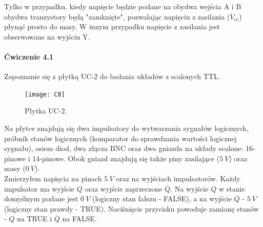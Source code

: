 \documentclass[14pt, table]{extarticle}
\newcommand{\nl}{\vspace{0.5cm}}
\begin{document}
\nl 
Tylko w przypadku, kiedy napięcie będzie podane na obydwa wejścia A i B obydwa tranzystory będą "zamknięte", pozwalając napięciu z zasilania ($V_{cc}$) płynąć prosto do masy. W innym przypadku napięcie z zasilania jest obserwowane na wyjściu Y.

\newpage
\paragraph{Ćwiczenie 4.1 \\}
Zapoznanie się z płytką UC-2 do badania układów z scalonych TTL.

\begin{figure}[H]
\texttt{[image: C0]}
\centering
\captionsetup{labelformat=empty}
\caption{Płytka UC-2.}
\end{figure}

Na płytce znajdują się dwa impulsatory do wytwarzania sygnałów logicznych, próbnik stanów logicznych (komparator do sprawdzania wartości logicznej sygnału), osiem diod, dwa złącza BNC oraz dwa gniazda na układy scalone: 16-pinowe i 14-pinowe. Obok gniazd znajdują się także piny zasilające ($5 \ V$) oraz masy ($0 \ V$). \\

\newpage
Zmierzyłem napięcia na pinach $5 \ V$ oraz na wyjściach impulsatorów. Każdy impulsator ma wyjście $Q$ oraz wyjście zaprzeczone $\overline{Q}$. Na wyjście $Q$ w stanie domyślnym podane jest $0 \ V$ (logiczny stan fałszu - FALSE), a na wyjście $\overline{Q}$ - $5 \ V$ (logiczny stan prawdy - TRUE). Naciśnięcie przycisku powoduje zamianę stanów - $Q$ na TRUE i $\overline{Q}$ na FALSE.

\begin{figure}[H]
    \centering
    \qquad
\end{figure}
\end{document}
